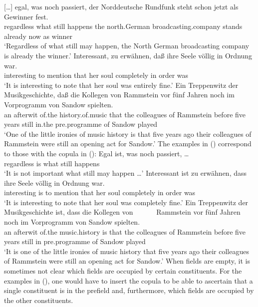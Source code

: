{}[\ldots]
\gll egal,      was  noch  passiert, der Norddeutsche Rundfunk             steht  schon   jetzt als Gewinner fest.\footnotemark\\
     regardless what still happens the north.German broadcasting.company stands already now as winner \particle\\
\glt `Regardless of what still may happen, the North German broadcasting company is already the winner.'
\ex 
\gll Interessant, zu erwähnen, daß ihre Seele völlig    in Ordnung war.\footnotemark\\
	 interesting to mention that her soul completely in order was\\
\glt `It is interesting to note that her soul was entirely fine.'
\ex
\gll Ein Treppenwitz der    Musikgeschichte, daß die Kollegen   von Rammstein vor    fünf Jahren noch im      Vorprogramm   von Sandow spielten.\footnotemark\\
	 an afterwit of.the history.of.music that the colleagues of Rammstein before five years still in.the pre.programme of Sandow played\\
\glt `One of the little ironies of music history is that five years ago their colleagues of Rammstein
were still an opening act for Sandow.'
\zl
The examples in () correspond to those with the copula in ():
\eal
\ex 
\gll Egal ist, was noch passiert, \ldots\\
     regardless is	 what still happens \\
\glt `It is not important what still may happen \ldots'
\ex
\gll Interessant ist zu erwähnen, dass ihre Seele völlig in Ordnung war.\\
	 interesting is to mention that her soul completely in order was\\
\glt `It is interesting to note that her soul was completely fine.'
\ex %
\gll Ein Treppenwitz der Musikgeschichte ist, dass die Kollegen von~~~~~~ Rammstein vor fünf Jahren noch im Vorprogramm von Sandow spielten.\hspace{-5pt}\\
	 an afterwit of.the music.history is that the colleagues of Rammstein before five years still in pre.programme of Sandow played\\
\glt `It is one of the little ironies of music history that five years ago their colleagues of Rammstein were still an opening act for Sandow.'
\zl
When fields are empty, it is sometimes not clear which fields are occupied by certain constituents. For the examples in (), one would have to
insert the copula to be able to ascertain that a single constituent is in the prefield and, furthermore, which fields are occupied by the other constituents.


